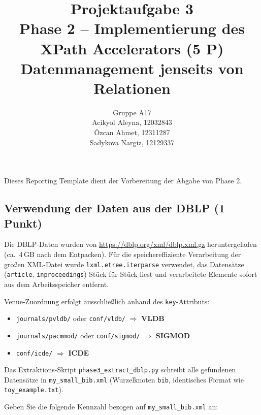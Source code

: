 \documentclass[11pt]{scrartcl}
\title{
  \textbf{\large Projektaufgabe 3 } \\
  Phase 2 – Implementierung des XPath Accelerators (5 P) \\
  {\large Datenmanagement jenseits von Relationen}
}
\author{
  Gruppe A17 \\
  \large Acikyol Aleyna, 12032843 \\
  \large Özcan Ahmet, 12311287 \\
  \large Sadykova Nargiz, 12129337
}
\begin{document}
\maketitle\thispagestyle{empty}

Dieses Reporting Template dient der Vorbereitung der Abgabe von Phase 2.

\subsection*{Verwendung der Daten aus der DBLP (1 Punkt)}

Die DBLP-Daten wurden von \url{https://dblp.org/xml/dblp.xml.gz} heruntergeladen (ca.\ 4\,GB nach dem Entpacken).
Für die speichereffiziente Verarbeitung der großen XML-Datei wurde \texttt{lxml.etree.iterparse}
verwendet, das Datensätze (\texttt{article}, \texttt{inproceedings}) Stück für Stück liest und
verarbeitete Elemente sofort aus dem Arbeitsspeicher entfernt.

Venue-Zuordnung erfolgt ausschließlich anhand des \texttt{key}-Attributs:
\begin{itemize}
  \item \texttt{journals/pvldb/} oder \texttt{conf/vldb/} $\Rightarrow$ \textbf{VLDB}
  \item \texttt{journals/pacmmod/} oder \texttt{conf/sigmod/} $\Rightarrow$ \textbf{SIGMOD}
  \item \texttt{conf/icde/} $\Rightarrow$ \textbf{ICDE}
\end{itemize}

Das Extraktions-Skript \texttt{phase3\_extract\_dblp.py} schreibt alle gefundenen Datensätze
in \texttt{my\_small\_bib.xml} (Wurzelknoten \texttt{bib}, identisches Format wie \texttt{toy\_example.txt}).

Geben Sie die folgende Kennzahl bezogen auf \texttt{my\_small\_bib.xml} an:
\end{document}
